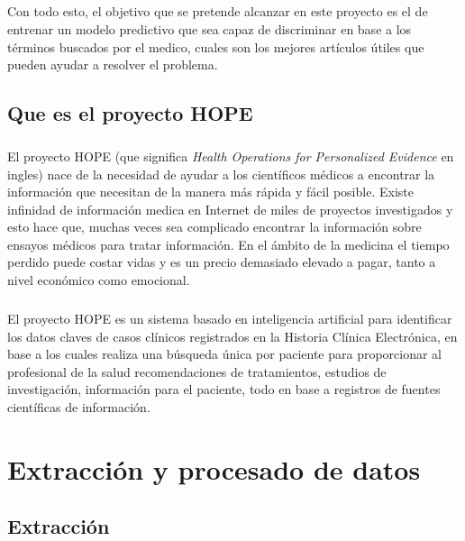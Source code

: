 \documentclass[10pt,a4paper]{book}
\begin{document}
\paragraph{}
Con todo esto, el objetivo que se pretende alcanzar en este proyecto es el de entrenar un modelo predictivo que sea capaz de discriminar en base a los términos buscados por el medico, cuales son los mejores artículos útiles que pueden ayudar a resolver el problema.

\section{Que es el proyecto HOPE}

\paragraph{}
El proyecto HOPE (que significa \textit{Health Operations for Personalized Evidence} en ingles) nace de la necesidad de ayudar a los científicos médicos a encontrar la información que necesitan de la manera más rápida y fácil posible. Existe infinidad de información medica en Internet de miles de proyectos investigados y esto hace que, muchas veces sea complicado encontrar la información sobre ensayos médicos para tratar información. En el ámbito de la medicina el tiempo perdido puede costar vidas y es un precio demasiado elevado a pagar, tanto a nivel económico como emocional.

\paragraph{}
El proyecto HOPE es un sistema basado en inteligencia artificial para identificar los datos claves de casos clínicos registrados en la Historia Clínica Electrónica, en base a los cuales realiza una búsqueda única por paciente para proporcionar al profesional de la salud recomendaciones de tratamientos, estudios de investigación, información para el paciente, todo en base a registros de fuentes científicas de información.


\chapter{Extracción y procesado de datos}

\section{Extracción}
\end{document}
